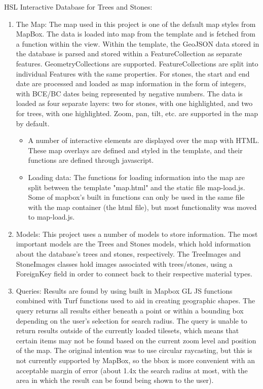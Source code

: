 \documentclass[]{article}
\begin{document}
\noindent HSL Interactive Database for Trees and Stones:  

\begin{enumerate}
	\item The Map: The map used in this project is one of the default map styles from MapBox. The data is loaded into map from the template and is fetched from a function within the view. Within the template, the GeoJSON data stored in the database is parsed and stored within a FeatureCollection as separate features. GeometryCollections are supported. FeatureCollections are split into individual Features with the same properties. For stones, the start and end date are processed and loaded as map information in the form of integers, with BCE/BC dates being represented by negative numbers. The data is loaded as four separate layers: two for stones, with one highlighted, and two for trees, with one highlighted. Zoom, pan, tilt, etc. are supported in the map by 	default. 
		\begin{itemize}
			\item A number of interactive elements are displayed over the map with HTML. These map overlays are defined and styled in the template, and their functions are defined through javascript. 
			\item Loading data: The functions for loading information into the map are split between the template "map.html" and the static file map-load.js. Some of mapbox's built in functions can only be used in the same file with the map container (the html file), but most functionality was moved to map-load.js.
		\end{itemize}
	\item Models: This project uses a number of models to store information. The most important models are the Trees and Stones models, which hold information about the database's trees and stones, respectively. The TreeImages and StoneImages classes hold images associated with trees/stones, using a ForeignKey field in order to connect back to their respective material types. 
	\item Queries: Results are found by using built in Mapbox GL JS functions combined with Turf functions used to aid in creating geographic shapes. The query returns all results either beneath a point or within a bounding box depending on the user's selection for search radius. The query is unable to return results outside of the currently loaded tilesets, which means that certain items may not be found based on the current zoom level and position of the map. The original intention was to use circular raycasting, but this is not currently supported by MapBox, so the bbox is more convenient with an acceptable margin of error (about 1.4x the search radius at most, with the area in which the result can be found being shown to the user). 

\end{enumerate}
\end{document}

